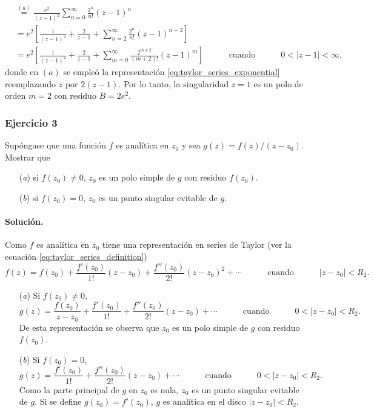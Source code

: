 \documentclass[a4paper]{report}
\begin{document}
\begin{enumerate}
\begin{align*}
    &\overset{(a)}{=}\frac{e^2}{(z-1)^2}\sum_{n=0}^\infty \frac{2^n}{n!}(z-1)^n\\
    &=e^2\left[\frac{1}{(z-1)^2}+\frac{2}{z-1}+\sum_{n=2}^\infty \frac{2^n}{n!}(z-1)^{n-2}\right]\\
    &=e^2\left[\frac{1}{(z-1)^2}+\frac{2}{z-1}+\sum_{m=0}^\infty \frac{2^{m+2}}{(m+2)!}(z-1)^m\right]
    \qquad\quad\textrm{cuando}\quad\qquad
    0<|z-1|<\infty,
 \end{align*}
donde en \((a)\) se empleó la representación \ref{eq:taylor_series_exponential} reemplazando \(z\) por \(2(z-1)\). Por lo tanto, la singularidad \(z=1\) es un polo de orden \(m=2\) con residuo \(B=2e^2\).
\end{enumerate}

\subsubsection*{Ejercicio 3}

Supóngase que una función \(f\) es analítica en \(z_0\) y sea \(g(z)=f(z)/(z-z_0)\). Mostrar que 
\begin{enumerate}
 \item[(\textit{a})] si \(f(z_0)\neq0\), \(z_0\) es un polo simple de \(g\) con residuo \(f(z_0)\).
 \item[(\textit{b})] si \(f(z_0)=0\), \(z_0\) es un punto singular evitable de \(g\). 
\end{enumerate}

\paragraph{Solución.} Como \(f\) es analítica en \(z_0\) tiene una representación en series de Taylor (ver la ecuación \ref{eq:taylor_series_definition})
\[
 f(z)=f(z_0)+\frac{f'(z_0)}{1!}(z-z_0)+\frac{f''(z_0)}{2!}(z-z_0)^2+\cdots
 \qquad\quad\textrm{cuando}\quad\qquad
 |z-z_0|<R_2.
\]
\begin{enumerate}
 \item[(\textit{a})] Si \(f(z_0)\neq0\),
 \[
  g(z)=\frac{f(z_0)}{z-z_0}+\frac{f'(z_0)}{1!}+\frac{f''(z_0)}{2!}(z-z_0)+\cdots
  \qquad\quad\textrm{cuando}\quad\qquad
  0<|z-z_0|<R_2.
 \]
 De esta representación se observa que \(z_0\) es un polo simple de \(g\) con residuo \(f(z_0)\).
 \item[(\textit{b})] Si \(f(z_0)=0\),
 \[
  g(z)=\frac{f'(z_0)}{1!}+\frac{f''(z_0)}{2!}(z-z_0)+\cdots
  \qquad\quad\textrm{cuando}\quad\qquad
  0<|z-z_0|<R_2.
 \]
 Como la parte principal de \(g\) en \(z_0\) es nula, \(z_0\) es un punto singular evitable de \(g\). Si se define \(g(z_0)=f'(z_0)\), \(g\) es analítica en el disco \(|z-z_0|<R_2\).
\end{enumerate}
\end{document}
